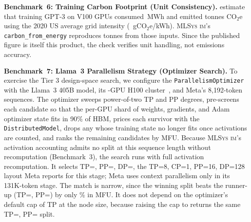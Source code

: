\documentclass[10pt,twocolumn]{article}
\newcommand{\mlsysim}{\mbox{\textsc{MLSys}\,\textperiodcentered\,\textsc{im}}\xspace}
\begin{document}
\textbf{Benchmark~6: Training Carbon Footprint (Unit Consistency).}
\citet{patterson2021carbon} estimate that training GPT-3 on V100 GPUs consumed \AnchorSixEnergyMWh\,MWh and emitted \AnchorSixReportedTonnes{} tonnes CO$_2$e using the 2020 US average grid intensity (\AnchorSixGridCi~gCO$_2$e/kWh). \mlsysim's \texttt{carbon\_from\_energy} reproduces \AnchorSixCarbonTonnes{} tonnes from those inputs. Since the published figure is itself this product, the check verifies unit handling, not emissions accuracy.

\textbf{Benchmark~7: Llama~3 Parallelism Strategy (Optimizer Search).}
To exercise the Tier 3 design-space search, we configure the \texttt{ParallelismOptimizer} with the Llama~3 405B model, its \AnchorThreeGpus-GPU H100 cluster~\citep{llama3team2024}, and Meta's 8{,}192-token sequences. The optimizer sweeps power-of-two TP and PP degrees, pre-screens each candidate so that the per-GPU shard of weights, gradients, and Adam optimizer state fits in 90\% of HBM, prices each survivor with the \texttt{DistributedModel}, drops any whose training state no longer fits once activations are counted, and ranks the \AnchorSevenCandidates{} remaining candidates by MFU. Because \mlsysim's activation accounting admits no split at this sequence length without recomputation (Benchmark~3), the search runs with full activation recomputation. It selects TP=\AnchorSevenTp, PP=\AnchorSevenPp, DP=\AnchorSevenDp, the TP=8, CP=1, PP=16, DP=128 layout Meta reports for this stage; Meta uses context parallelism only in its 131K-token stage. The match is narrow, since the winning split beats the runner-up (TP=\AnchorSevenRunnerUpTp, PP=\AnchorSevenRunnerUpPp) by only \AnchorSevenRunnerUpMarginPct\% in MFU. It does not depend on the optimizer's default cap of TP at the node size, because raising the cap to \AnchorSevenWideMaxTp{} returns the same TP=\AnchorSevenWideTp, PP=\AnchorSevenWidePp{} split.
\end{document}

